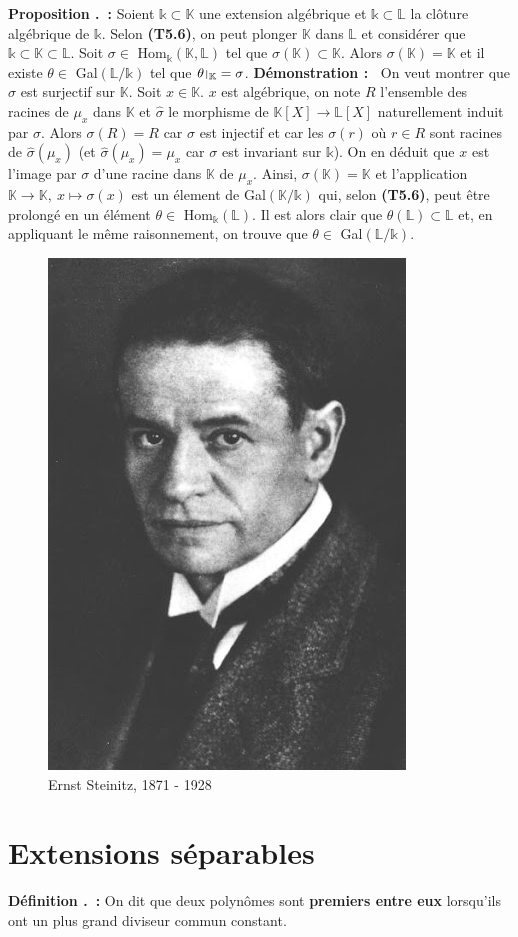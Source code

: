 \documentclass[5pt,a4paper]{article}
\newcounter{prop}[section]
\newcounter{defin}[section]
\renewcommand{\theprop}{\thesection.\arabic{prop}}
\renewcommand{\thedefin}{\thesection.\arabic{defin}}
\newcommand{\prop}[1]{\stepcounter{prop}\noindent\textbf{Proposition \theprop ~:} #1 \newline}
\newcommand{\defin}[1]{\stepcounter{defin}\noindent\textbf{Définition \thedefin ~:} #1 \newline}
\newcommand{\demo}[1]{\textbf{Démonstration :~} #1 \newline}
\def\restriction#1#2{\mathchoice
              {\setbox1\hbox{${\displaystyle #1}_{\scriptstyle #2}$}
              \restrictionaux{#1}{#2}}
              {\setbox1\hbox{${\textstyle #1}_{\scriptstyle #2}$}
              \restrictionaux{#1}{#2}}
              {\setbox1\hbox{${\scriptstyle #1}_{\scriptscriptstyle #2}$}
              \restrictionaux{#1}{#2}}
              {\setbox1\hbox{${\scriptscriptstyle #1}_{\scriptscriptstyle #2}$}
              \restrictionaux{#1}{#2}}}
\def\restrictionaux#1#2{{#1\,\smash{\vrule height .8\ht1 depth .85\dp1}}_{\,#2}}
\begin{document}
\begin{onehalfspacing}
\prop{Soient $\mathds{k} \subset \mathbb{K}$ une extension algébrique et $\mathds{k} \subset \mathbb{L}$ la clôture algébrique de $\mathds{k}$. Selon \textbf{(T5.6)}, on peut plonger $\mathbb{K}$ dans $\mathbb{L}$ et considérer que $\mathds{k} \subset \mathbb{K} \subset \mathbb{L}$. Soit $\sigma \in$ Hom$_\mathds{k}(\mathbb{K}, \mathbb{L})$ tel que $\sigma(\mathbb{K}) \subset \mathbb{K}$. Alors $\sigma(\mathbb{K}) = \mathbb{K}$ et il existe $\theta \in$ Gal$(\mathbb{L}/\mathds{k})$ tel que $\restriction{\theta}{\mathbb{K}} = \sigma$.}
\demo{On veut montrer que $\sigma$ est surjectif sur $\mathbb{K}$. Soit $x \in \mathbb{K}$. $x$ est algébrique, on note $R$ l'ensemble des racines de $\mu_x$ dans $\mathbb{K}$ et $\hat{\sigma}$ le morphisme de $\mathbb{K}[X] \rightarrow \mathbb{L}[X]$ naturellement induit par $\sigma$. Alors $\sigma(R) = R$ car $\sigma$ est injectif et car les $\sigma(r)$ où $r \in R$ sont racines de $\hat{\sigma}(\mu_x)$ (et $\hat{\sigma}(\mu_x) = \mu_x$ car $\sigma$ est invariant sur $\mathds{k}$). On en déduit que $x$ est l'image par $\sigma$ d'une racine dans $\mathbb{K}$ de $\mu_x$. Ainsi, $\sigma(\mathbb{K}) = \mathbb{K}$ et l'application $\mathbb{K} \rightarrow \mathbb{K},~x \mapsto \sigma(x)$ est un élement de Gal$(\mathbb{K}/\mathds{k})$ qui, selon \textbf{(T5.6)}, peut être prolongé en un élément $\theta \in$ Hom$_\mathds{k}(\mathbb{L})$. Il est alors clair que $\theta(\mathbb{L}) \subset \mathbb{L}$ et, en appliquant le même raisonnement, on trouve que $\theta \in$ Gal$(\mathbb{L}/\mathds{k})$.}


\begin{figure}[!h]
\centering
\includegraphics[width = 0.33\linewidth]{ressources/steinitz.jpg}
\caption{Ernst Steinitz, 1871 - 1928}
\end{figure}

\newpage
\section{Extensions séparables}
\defin{On dit que deux polynômes sont \textbf{premiers entre eux} lorsqu'ils ont un plus grand diviseur commun constant.}



\end{onehalfspacing}
\end{document}

